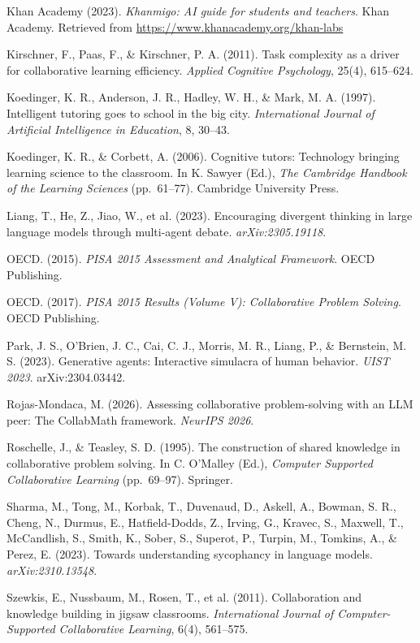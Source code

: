 \documentclass[
  11pt,
]{article}
\begin{document}
Khan Academy (2023). \emph{Khanmigo: AI guide for students and teachers}. Khan Academy. Retrieved from \url{https://www.khanacademy.org/khan-labs}

Kirschner, F., Paas, F., \& Kirschner, P. A. (2011). Task complexity as a driver for collaborative learning efficiency. \emph{Applied Cognitive Psychology}, 25(4), 615--624.

Koedinger, K. R., Anderson, J. R., Hadley, W. H., \& Mark, M. A. (1997). Intelligent tutoring goes to school in the big city. \emph{International Journal of Artificial Intelligence in Education}, 8, 30--43.

Koedinger, K. R., \& Corbett, A. (2006). Cognitive tutors: Technology bringing learning science to the classroom. In K. Sawyer (Ed.), \emph{The Cambridge Handbook of the Learning Sciences} (pp.\ 61--77). Cambridge University Press.

Liang, T., He, Z., Jiao, W., et al. (2023). Encouraging divergent thinking in large language models through multi-agent debate. \emph{arXiv:2305.19118}.

OECD. (2015). \emph{PISA 2015 Assessment and Analytical Framework}. OECD Publishing.

OECD. (2017). \emph{PISA 2015 Results (Volume V): Collaborative Problem Solving}. OECD Publishing.

Park, J. S., O'Brien, J. C., Cai, C. J., Morris, M. R., Liang, P., \& Bernstein, M. S. (2023). Generative agents: Interactive simulacra of human behavior. \emph{UIST 2023}. arXiv:2304.03442.

Rojas-Mondaca, M. (2026). Assessing collaborative problem-solving with an LLM peer: The CollabMath framework. \emph{NeurIPS 2026}.

Roschelle, J., \& Teasley, S. D. (1995). The construction of shared knowledge in collaborative problem solving. In C. O'Malley (Ed.), \emph{Computer Supported Collaborative Learning} (pp.\ 69--97). Springer.

Sharma, M., Tong, M., Korbak, T., Duvenaud, D., Askell, A., Bowman, S. R., Cheng, N., Durmus, E., Hatfield-Dodds, Z., Irving, G., Kravec, S., Maxwell, T., McCandlish, S., Smith, K., Sober, S., Superot, P., Turpin, M., Tomkins, A., \& Perez, E. (2023). Towards understanding sycophancy in language models. \emph{arXiv:2310.13548}.

Szewkis, E., Nussbaum, M., Rosen, T., et al. (2011). Collaboration and knowledge building in jigsaw classrooms. \emph{International Journal of Computer-Supported Collaborative Learning}, 6(4), 561--575.
\end{document}
